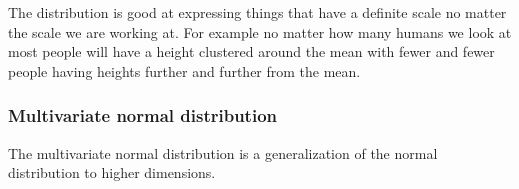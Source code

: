 \documentclass[12pt]{article}
\begin{document}
The distribution is good at expressing things that have a definite scale no matter the scale we are working at. For example no matter how many humans we look at most people will have a height clustered around the mean with fewer and fewer people having heights further and further from the mean.

\subsubsection*{Multivariate normal distribution}

\begin{definition}
    The multivariate normal distribution is a generalization of the normal distribution to higher dimensions.
\end{definition}
\end{document}
